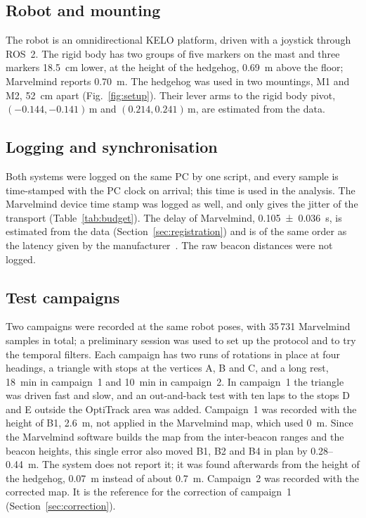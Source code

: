\documentclass[conference]{IEEEtran}
\begin{document}
\subsection{Robot and mounting}\label{sec:mounting}
The robot is an omnidirectional KELO platform, driven with a joystick
through ROS~2. The rigid body has two groups of five markers on the mast and three markers
\SI{18.5}{cm} lower, at the height of the hedgehog, \SI{0.69}{m} above the floor; Marvelmind reports
\SI{0.70}{m}. The hedgehog was used in two mountings, M1 and M2, \SI{52}{cm} apart
(Fig.~\ref{fig:setup}). Their lever arms to the rigid body pivot, $(-0.144, -0.141)$\,m and
$(0.214, 0.241)$\,m, are estimated from the data.

\subsection{Logging and synchronisation}
Both systems were logged on the same PC by one script, and every sample is time-stamped with the PC
clock on arrival; this time is used in the analysis. The Marvelmind device time stamp was logged as
well, and only gives the jitter of the transport (Table~\ref{tab:budget}). The delay of Marvelmind,
\SI{0.105 +- 0.036}{s}, is estimated from the data (Section~\ref{sec:registration}) and is of the same
order as the latency given by the manufacturer~\cite{marvelmind2026manual}. The raw beacon distances
were not logged.

\subsection{Test campaigns}
Two campaigns were recorded at the same robot poses, with 35\,731 Marvelmind samples in total; a
preliminary session was used to set up the protocol and to try the temporal filters. Each campaign has
two runs of rotations in
place at four headings, a triangle with stops at the vertices A, B and C, and a long rest, \SI{18}{min}
in campaign~1 and \SI{10}{min} in campaign~2. In campaign~1 the triangle was driven fast and slow, and
an out-and-back test with ten laps to the stops D and E outside the OptiTrack area was added. Campaign~1 was recorded with the height of B1, \SI{2.6}{m}, not applied in the Marvelmind
map, which used \SI{0}{m}. Since the Marvelmind software builds the map from the inter-beacon ranges and
the beacon heights, this single error also moved B1, B2 and B4 in plan by 0.28--\SI{0.44}{m}. The
system does not report it; it was found afterwards from the height of the hedgehog, \SI{0.07}{m}
instead of about \SI{0.7}{m}. Campaign~2 was recorded with the corrected map. It is the
reference for the correction of campaign~1 (Section~\ref{sec:correction}).
\end{document}
